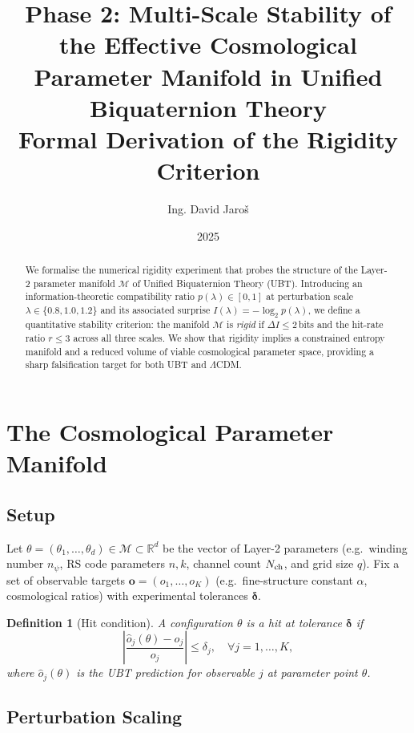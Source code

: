 \documentclass[12pt]{article}
\title{%
  Phase 2: Multi-Scale Stability of the Effective Cosmological\\
  Parameter Manifold in Unified Biquaternion Theory\\[4pt]
  {\large Formal Derivation of the Rigidity Criterion}%
}
\author{Ing. David Jaroš}
\date{2025}
\newtheorem{definition}{Definition}[section]
\newcommand{\R}{\mathbb{R}}
\newcommand{\calM}{\mathcal{M}}
\begin{document}
\maketitle

\begin{abstract}
We formalise the numerical rigidity experiment that probes the structure of the
Layer-2 parameter manifold $\calM$ of Unified Biquaternion Theory (UBT).
Introducing an information-theoretic compatibility ratio
$p(\lambda)\in[0,1]$ at perturbation scale $\lambda\in\{0.8,1.0,1.2\}$ and its
associated surprise $I(\lambda)=-\log_2 p(\lambda)$, we define a quantitative
stability criterion: the manifold $\calM$ is \emph{rigid} if
$\Delta I \leq 2$\,bits and the hit-rate ratio $r \leq 3$ across all three scales.
We show that rigidity implies a constrained entropy manifold and a reduced volume
of viable cosmological parameter space, providing a sharp falsification target
for both UBT and $\Lambda$CDM.
\end{abstract}

\tableofcontents

\section{The Cosmological Parameter Manifold}

\subsection{Setup}

Let $\theta = (\theta_1,\dots,\theta_d)\in\calM\subset\R^d$ be the vector of
Layer-2 parameters (e.g.\ winding number $n_\psi$, RS code parameters $n,k$,
channel count $N_{\rm ch}$, and grid size $q$).
Fix a set of observable targets
$\mathbf{o} = (o_1,\dots,o_K)$ (e.g.\ fine-structure constant $\alpha$,
cosmological ratios) with experimental tolerances $\boldsymbol{\delta}$.

\begin{definition}[Hit condition]
\label{def:hit}
A configuration $\theta$ is a \emph{hit} at tolerance $\boldsymbol{\delta}$ if
\[
  \left|\frac{\hat{o}_j(\theta) - o_j}{o_j}\right| \leq \delta_j,
  \quad\forall j=1,\dots,K,
\]
where $\hat{o}_j(\theta)$ is the UBT prediction for observable $j$ at parameter
point $\theta$.
\end{definition}

\subsection{Perturbation Scaling}
\end{document}
